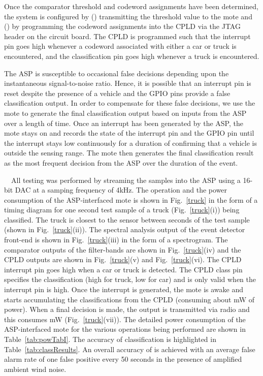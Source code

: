 Once the comparator threshold and codeword assignments have been determined, the system is configured by () transmitting the threshold value to the mote and () by programming the codeword assignments into the CPLD via the JTAG header on the circuit board.  The CPLD is programmed such that the interrupt pin goes high whenever a codeword associated with either a car or truck is encountered, and the classification pin goes high whenever a truck is encountered.  

The ASP is susceptible to occasional false decisions depending upon the instantaneous signal-to-noise ratio. Hence, it is possible that an interrupt pin is reset despite the presence of a vehicle and the GPIO pins provide a false classification output. In order to compensate for these false decisions, we use the mote to generate the final classification output based on inputs from the ASP over a length of time. Once an interrupt has been generated by the ASP, the mote stays on and records the state of the interrupt pin and the GPIO pin until the interrupt stays low continuously for a duration of  confirming that a vehicle is outside the sensing range. The mote then generates the final classification result as the most frequent decision from the ASP over the duration of the event.

~~All testing was performed by streaming the samples into the ASP using a 16-bit DAC at a samping frequency of 4kHz.  The operation and the power consumption of the ASP-interfaced mote is shown in Fig.~\ref{truck} in the form of a timing diagram for one   second test sample of a truck (Fig.~\ref{truck}(i)) being classified. The truck is closest to the sensor between seconds  of the test sample (shown in Fig.~\ref{truck}(ii)). The spectral analysis output of the event detector front-end is shown in Fig.~\ref{truck}(iii) in the form of a spectrogram.  The comparator outputs of the  filter-bands are shown in Fig.~\ref{truck}(iv) and the CPLD outputs are shown in Fig.~\ref{truck}(v) and Fig.~\ref{truck}(vi). The CPLD interrupt pin goes high when a car or truck is detected. The CPLD class pin specifies the classification (high for truck, low for car) and is only valid when the interrupt pin is high. Once the interrupt is generated, the mote is awake and starts accumulating the classifications from the CPLD (consuming about  mW of power). When a final decision is made, the output is transmitted via radio and this consumes mW (Fig.~\ref{truck}(vii)). The detailed power consumption of the ASP-interfaced mote for the various operations being performed are shown in Table~\ref{tab:powTabI}. The accuracy of classification is highlighted in Table~\ref{tab:classResults}. An overall accuracy of  is achieved with an average false alarm rate of one false positive every 50 seconds in the presence of amplified ambient wind noise.







